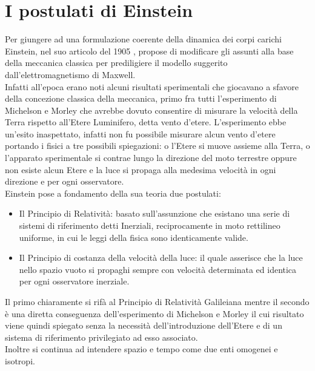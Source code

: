 \section{I postulati di Einstein}
Per giungere ad una formulazione coerente della dinamica 
dei corpi carichi Einstein, nel suo articolo del 1905 \cite{Einstein1905}, 
propose di modificare gli assunti alla base della meccanica classica per 
prediligiere il modello suggerito dall'elettromagnetismo di Maxwell.\\
Infatti all'epoca erano noti alcuni risultati sperimentali che giocavano 
a sfavore della concezione classica della meccanica, primo fra tutti l'esperimento di 
Michelson e Morley che avrebbe dovuto consentire di misurare la velocità della Terra 
rispetto all'Etere Luminifero, detta vento d'etere. L'esperimento ebbe un'esito inaspettato, infatti non fu 
possibile misurare alcun vento d'etere portando i fisici a tre possibili spiegazioni: 
o l'Etere si muove assieme alla Terra, o l'apparato sperimentale si contrae lungo la direzione del moto terrestre 
oppure non esiste alcun Etere e la luce si propaga alla medesima velocità in ogni direzione e per ogni osservatore.\\

Einstein pose a fondamento della sua teoria due postulati:
\begin{itemize}
    \item Il Principio di Relatività: basato sull'assunzione che esistano 
    una serie di sistemi di riferimento detti Inerziali, reciprocamente in moto rettilineo uniforme, in cui le leggi della fisica sono identicamente valide.
    \item Il Principio di costanza della velocità della luce: il quale asserisce che la luce nello spazio vuoto si propaghi 
    sempre con velocità determinata ed identica per ogni osservatore inerziale. 
\end{itemize}
Il primo chiaramente si rifà al Principio di Relatività Galileiana mentre il secondo è una diretta conseguenza 
dell'esperimento di Michelson e Morley il cui risultato viene quindi spiegato senza la necessità dell'introduzione 
dell'Etere e di un sistema di riferimento privilegiato ad esso associato.\\ Inoltre si continua ad intendere spazio e tempo come due enti omogenei e isotropi.

